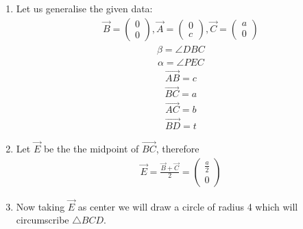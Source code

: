 \documentclass[journal,12pt,twocolumn]{IEEEtran}
\newcommand{\myvec}[1]{\ensuremath{\begin{pmatrix}#1\end{pmatrix}}}
\begin{document}
\begin{enumerate}
    \item  Let us generalise the given data:
\begin{align}
\vec{B}= \myvec{0\\0}, \vec{A}=\myvec{0\\c}, \vec{C}= \myvec{a\\0}
\end{align}
\begin{align}
    \beta= \angle DBC
\end{align}
\begin{align}
    \alpha= \angle PEC
\end{align}
\begin{align}
\vec{AB}=c
\end{align}
\begin{align}
    \vec{BC}=a
\end{align}
\begin{align}
    \vec{AC}=b
\end{align}
\begin{align}
    \vec{BD}=t
\end{align}
\item Let $\vec{E}$ be the the midpoint of $\vec{BC}$, therefore
\begin{align}
    \vec{E}= \frac{\vec{B}+\vec{C}}{2}= \myvec{\frac{a}{2}\\0}
    \end{align}
    \item Now taking $\vec{E}$ as center we will draw a circle of radius 4 which will circumscribe $\triangle BCD$.\\
    

\end{enumerate}
\end{document}
